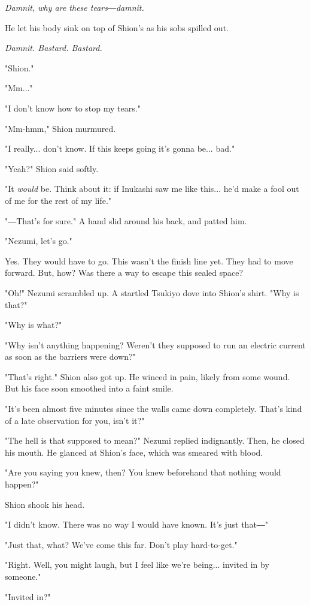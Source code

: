 \emph{Damnit, why are these tears―damnit.}

He let his body sink on top of Shion's as his sobs spilled out.

\emph{Damnit. Bastard. Bastard.}

"Shion."

"Mm..."

"I don't know how to stop my tears."

"Mm-hmm," Shion murmured.

"I really... don't know. If this keeps going it's gonna be... bad."

"Yeah?" Shion said softly.

"It \emph{would} be. Think about it: if Inukashi saw me like this... he'd make
a fool out of me for the rest of my life."

"―That's for sure." A hand slid around his back, and patted him.

"Nezumi, let's go."

Yes. They would have to go. This wasn't the finish line yet. They had to
move forward. But, how? Was there a way to escape this sealed space?

"Oh!" Nezumi scrambled up. A startled Tsukiyo dove into Shion's shirt.
"Why is that?"

"Why is what?"

"Why isn't anything happening? Weren't they supposed to run an electric
current as soon as the barriers were down?"

"That's right." Shion also got up. He winced in pain, likely from some
wound. But his face soon smoothed into a faint smile.

"It's been almost five minutes since the walls came down completely.
That's kind of a late observation for you, isn't it?"

"The hell is that supposed to mean?" Nezumi replied indignantly. Then,
he closed his mouth. He glanced at Shion's face, which was smeared with
blood.

"Are you saying you knew, then? You knew beforehand that nothing would
happen?"

Shion shook his head.

"I didn't know. There was no way I would have known. It's just that―"

"Just that, what? We've come this far. Don't play hard-to-get."

"Right. Well, you might laugh, but I feel like we're being... invited in
by someone."

"Invited in?"

